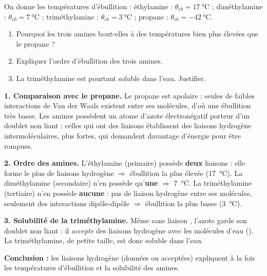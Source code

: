 \documentclass[11pt]{article}
\newcommand{\cle}[1]{{\popxbold\color{popdark}#1}}
\newcounter{popsec}
\newcounter{popsub}
\newcommand{\courssub}[1]{%
  \stepcounter{popsub}%
  \par\vspace{9pt}\noindent{\popxbold\fontsize{11.5}{13}\selectfont\color{popink}{\color{poporange}\thepopsec.\thepopsub}\hspace{6pt}#1}\par\nopagebreak\vspace{4pt}
}
\begin{document}
\begin{exoresolu}
On donne les températures d'ébullition : éthylamine  : $\theta_{eb} = \SI{17}{\celsius}$ ; diméthylamine  : $\theta_{eb} = \SI{7}{\celsius}$ ; triméthylamine  : $\theta_{eb} = \SI{3}{\celsius}$ ; propane  : $\theta_{eb} = \SI{-42}{\celsius}$.
\begin{enumerate}
\item Pourquoi les trois amines bout-elles à des températures bien plus élevées que le propane ?
\item Expliquer l'ordre d'ébullition des trois amines.
\item La triméthylamine est pourtant soluble dans l'eau. Justifier.
\end{enumerate}
\tcblower
\textbf{1. Comparaison avec le propane.} Le propane est apolaire : seules de faibles interactions de Van der Waals existent entre ses molécules, d'où une ébullition très basse. Les amines possèdent un atome d'azote électronégatif porteur d'un doublet non liant ; celles qui ont des liaisons  établissent des \cle{liaisons hydrogène} intermoléculaires, plus fortes, qui demandent davantage d'énergie pour être rompues.

\textbf{2. Ordre des amines.} L'éthylamine (primaire) possède \textbf{deux} liaisons  : elle forme le plus de liaisons hydrogène $\Rightarrow$ ébullition la plus élevée (\SI{17}{\celsius}). La diméthylamine (secondaire) n'en possède qu'\textbf{une} $\Rightarrow$ \SI{7}{\celsius}. La triméthylamine (tertiaire) n'en possède \textbf{aucune} : pas de liaison hydrogène entre ses molécules, seulement des interactions dipôle-dipôle $\Rightarrow$ ébullition la plus basse (\SI{3}{\celsius}).

\textbf{3. Solubilité de la triméthylamine.} Même sans liaison , l'azote garde son \cle{doublet non liant} : il \emph{accepte} des liaisons hydrogène avec les molécules d'eau (). La triméthylamine, de petite taille, est donc soluble dans l'eau.

\textbf{Conclusion :} les liaisons hydrogène (données ou acceptées) expliquent à la fois les températures d'ébullition et la solubilité des amines.
\end{exoresolu}

\courssub{Caractère basique des amines}
\end{document}
